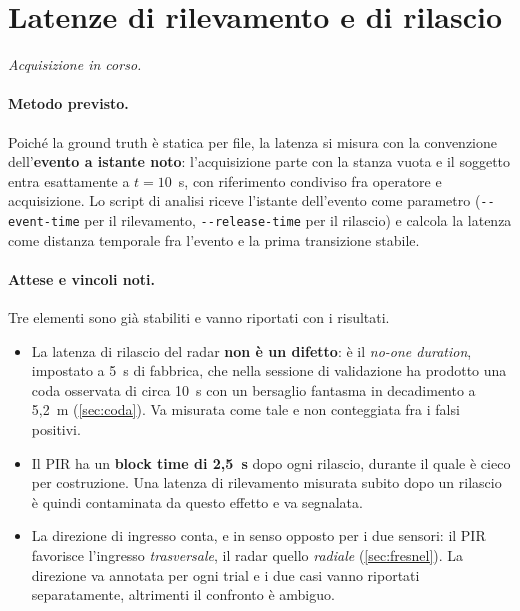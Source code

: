 \section{Latenze di rilevamento e di rilascio}
\label{sec:latenza}

\emph{Acquisizione in corso.}

\paragraph{Metodo previsto.} Poiché la ground truth è statica per file, la latenza
si misura con la convenzione dell'\textbf{evento a istante noto}: l'acquisizione
parte con la stanza vuota e il soggetto entra esattamente a $t = 10$~s, con
riferimento condiviso fra operatore e acquisizione. Lo script di analisi riceve
l'istante dell'evento come parametro (\texttt{-{}-event-time} per il rilevamento,
\texttt{-{}-release-time} per il rilascio) e calcola la latenza come distanza
temporale fra l'evento e la prima transizione stabile.

\paragraph{Attese e vincoli noti.} Tre elementi sono già stabiliti e vanno riportati
con i risultati.

\begin{itemize}[leftmargin=1.4em,itemsep=2pt]
  \item La latenza di rilascio del radar \textbf{non è un difetto}: è il
        \emph{no-one duration}, impostato a 5~s di fabbrica, che nella sessione di
        validazione ha prodotto una coda osservata di circa 10~s con un bersaglio
        fantasma in decadimento a 5,2~m (\cref{sec:coda}). Va misurata come tale e
        non conteggiata fra i falsi positivi.
  \item Il PIR ha un \textbf{block time di 2,5~s} dopo ogni rilascio, durante il
        quale è cieco per costruzione. Una latenza di rilevamento misurata subito
        dopo un rilascio è quindi contaminata da questo effetto e va segnalata.
  \item La direzione di ingresso conta, e in senso opposto per i due sensori: il PIR
        favorisce l'ingresso \emph{trasversale}, il radar quello \emph{radiale}
        (\cref{sec:fresnel}). La direzione va annotata per ogni trial e i due casi
        vanno riportati separatamente, altrimenti il confronto è ambiguo.
\end{itemize}

